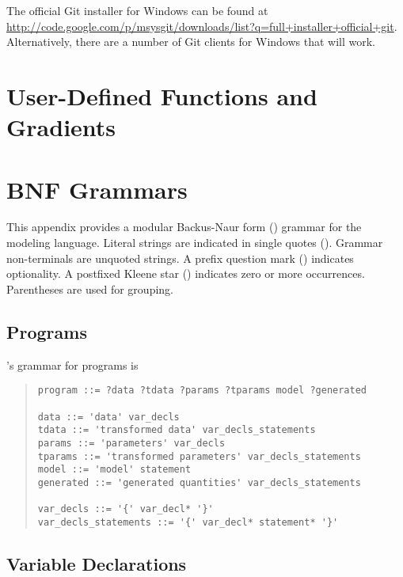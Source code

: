The official Git installer for Windows can be found at
\url{http://code.google.com/p/msysgit/downloads/list?q=full+installer+official+git}. Alternatively,
there are a number of Git clients for Windows that will work.

\chapter{User-Defined Functions and Gradients}\label{user-defined-functions.appendix}


\chapter{BNF Grammars}

This appendix provides a modular Backus-Naur form (\BNF) grammar for
the \Stan modeling language.  Literal strings are indicated in single
quotes ().  Grammar non-terminals are unquoted strings.  A
prefix question mark () indicates optionality.  A postfixed
Kleene star (\code{*}) indicates zero or more occurrences.
Parentheses are used for grouping.

\section{Programs}

\Stan's grammar for programs is
%
\begin{quote}
\begin{Verbatim}
program ::= ?data ?tdata ?params ?tparams model ?generated

data ::= 'data' var_decls
tdata ::= 'transformed data' var_decls_statements
params ::= 'parameters' var_decls
tparams ::= 'transformed parameters' var_decls_statements
model ::= 'model' statement
generated ::= 'generated quantities' var_decls_statements

var_decls ::= '{' var_decl* '}'
var_decls_statements ::= '{' var_decl* statement* '}'
\end{Verbatim}
\end{quote}

\section{Variable Declarations}

